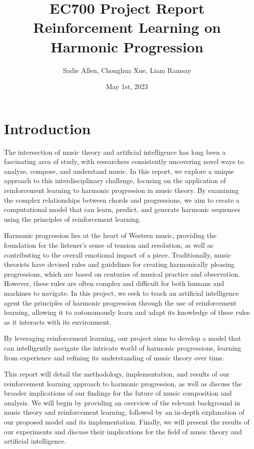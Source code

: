 \documentclass[12pt, letterpaper]{article}
\title{
    EC700 Project Report \\
    Reinforcement Learning on Harmonic Progression
}
\author{Sadie Allen, Chonghua Xue, Liam Ramsay}
\date{May 1st, 2023}
\begin{document}
\maketitle
\tableofcontents
\newpage

\section{Introduction}

The intersection of music theory and artificial intelligence has long been a fascinating area of study, with researchers consistently uncovering novel ways to analyze, compose, and understand music. In this report, we explore a unique approach to this interdisciplinary challenge, focusing on the application of reinforcement learning to harmonic progression in music theory. By examining the complex relationships between chords and progressions, we aim to create a computational model that can learn, predict, and generate harmonic sequences using the principles of reinforcement learning.

Harmonic progression lies at the heart of Western music, providing the foundation for the listener's sense of tension and resolution, as well as contributing to the overall emotional impact of a piece. Traditionally, music theorists have devised rules and guidelines for creating harmonically pleasing progressions, which are based on centuries of musical practice and observation. However, these rules are often complex and difficult for both humans and machines to navigate. In this project, we seek to teach an artificial intelligence agent the principles of harmonic progression through the use of reinforcement learning, allowing it to autonomously learn and adapt its knowledge of these rules as it interacts with its environment.

By leveraging reinforcement learning, our project aims to develop a model that can intelligently navigate the intricate world of harmonic progressions, learning from experience and refining its understanding of music theory over time.

This report will detail the methodology, implementation, and results of our reinforcement learning approach to harmonic progression, as well as discuss the broader implications of our findings for the future of music composition and analysis. We will begin by providing an overview of the relevant background in music theory and reinforcement learning, followed by an in-depth explanation of our proposed model and its implementation. Finally, we will present the results of our experiments and discuss their implications for the field of music theory and artificial intelligence.
\end{document}

